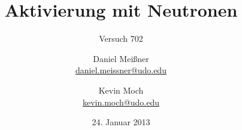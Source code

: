 


\newcommand{\name}[1]{\textsc{#1}}

\titlehead{{TU Dortmund \hfill WS~12/13\\}
Fakultät Physik\\
Experimentelle Übungen I}

\subject{Versuchsprotokoll}
\title{Aktivierung mit Neutronen}
\subtitle{Versuch 702}

\author{Daniel Meißner\\
{\normalsize\url{daniel.meissner@udo.edu}}
\and
Kevin Moch\\
{\normalsize\url{kevin.moch@udo.edu}}}

\date{24. Januar 2013}


\maketitle

\tableofcontents
\clearpage







\printbibliography
\nocite{v702}

\theappendix


